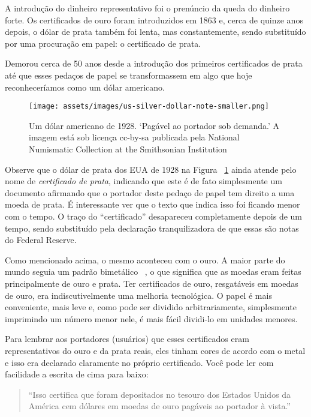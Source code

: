 A introdução do dinheiro representativo foi o prenúncio da queda do dinheiro forte. Os certificados de ouro foram introduzidos em 1863 e, cerca de quinze anos depois, o dólar de prata também foi lenta, mas constantemente, sendo substituído por uma procuração em papel: o certificado de prata. \cite{wiki:silver-certificate}

Demorou cerca de 50 anos desde a introdução dos primeiros certificados de prata até que esses pedaços de papel se transformassem em algo que hoje reconheceríamos como um dólar americano.

\begin{figure}
  \centering
  \texttt{[image: assets/images/us-silver-dollar-note-smaller.png]}
  \caption{Um dólar americano de 1928. `Pagável ao portador sob demanda.' A imagem está sob licença cc-by-sa publicada pela National Numismatic Collection at the Smithsonian Institution}
  \label{fig:us-silver-dollar-note-smaller}
\end{figure}

Observe que o dólar de prata dos EUA de 1928 na Figura ~\ref{fig:us-silver-dollar-note-smaller} ainda atende pelo nome de \textit{certificado de prata}, indicando que este é de fato simplesmente um documento afirmando que o portador deste pedaço de papel tem direito a uma moeda de prata. É interessante ver que o texto que indica isso foi ficando menor com o tempo. O traço do \enquote{certificado} desapareceu completamente depois de um tempo, sendo substituído pela declaração tranquilizadora de que essas são notas do Federal Reserve.

Como mencionado acima, o mesmo aconteceu com o ouro. A maior parte do mundo seguia um padrão bimetálico ~\cite {wiki:bimetallism}, o que significa que as moedas eram feitas principalmente de ouro e prata. Ter certificados de ouro, resgatáveis em moedas de ouro, era indiscutivelmente uma melhoria tecnológica. O papel é mais conveniente, mais leve e, como pode ser dividido arbitrariamente, simplesmente imprimindo um número menor nele, é mais fácil dividi-lo em unidades menores.

Para lembrar aos portadores (usuários) que esses certificados eram representativos do ouro e da prata reais, eles tinham cores de acordo com o metal e isso era declarado claramente no próprio certificado. Você pode ler com facilidade a escrita de cima para baixo:

\begin{quotation}\begin{samepage}
\enquote{Isso certifica que foram depositados no tesouro dos Estados Unidos da América cem dólares em moedas de ouro pagáveis ao portador à vista.}
\end{samepage}\end{quotation}

